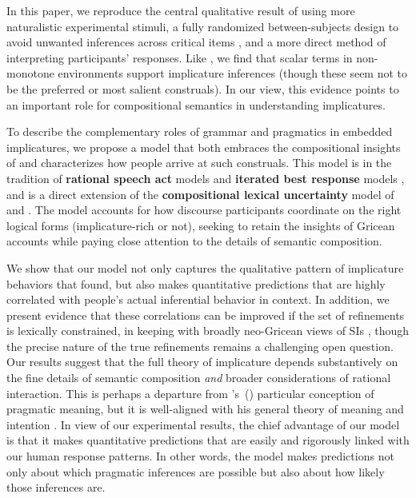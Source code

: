 \documentclass[leqno,12pt]{article}
\newcommand{\posscitet}[1]{\citeauthor{#1}'s~(\citeyear{#1})}
\newcommand{\tech}[1]{\textbf{#1}}
\begin{document}
{In this paper, we reproduce the central qualitative result of
\citet{Chemla:Spector:2011} using more naturalistic experimental
stimuli, a fully randomized between-subjects design to avoid unwanted
inferences across critical items \citep{geurts-vantiel:2013:scalar},
and a more direct method of interpreting participants' responses. Like
\citeauthor{Chemla:Spector:2011}, we find that scalar terms in
non-monotone environments support implicature inferences (though these
seem not to be the preferred or most salient construals).  In our
view, this evidence points to an important role for compositional
semantics in understanding implicatures.

To describe the complementary roles of grammar and pragmatics in
embedded implicatures, we propose a model that both embraces the
compositional insights of \citeauthor{ChierchiaFoxSpector08} and
characterizes how people arrive at such construals. This model is in
the tradition of \tech{rational speech act} models
\citep{Frank:Goodman:2012,Goodman:Stuhlmuller:2013} and \tech{iterated
  best response} models \citep{Franke09DISS,Jaeger:2011}, and is a
direct extension of the \tech{compositional lexical uncertainty} model
of \citet{Bergen:Goodman:Levy:2012} and
\citet{Bergen:Levy:Goodman:2014}. The model accounts for how discourse
participants coordinate on the right logical forms (implicature-rich
or not), seeking to retain the insights of Gricean accounts while
paying close attention to the details of semantic composition.

We show that our model not only captures the qualitative pattern of
implicature behaviors that \citeauthor{Chemla:Spector:2011} found, but
also makes quantitative predictions that are highly correlated with
people's actual inferential behavior in context. In addition, we
present evidence that these correlations can be improved if the set of
refinements is lexically constrained, in keeping with broadly
neo-Gricean views of SIs
\citep{Horn72,Gazdar79b,Gazdar79a,SchulzVanRooij06}, though the
precise nature of the true refinements remains a challenging open
question.  Our results suggest that the full theory of implicature
depends substantively on the fine details of semantic composition
\emph{and} broader considerations of rational interaction. This is
perhaps a departure from \posscitet{Grice75} particular conception of
pragmatic meaning, but it is well-aligned with his general theory of
meaning and intention \citep{Grice68,Grice89,sep-grice}. In view of
our experimental results, the chief advantage of our model is that it
makes quantitative predictions that are easily and rigorously linked
with our human response patterns. In other words, the model makes
predictions not only about which pragmatic inferences are possible but
also about how likely those inferences are.

}
\end{document}
